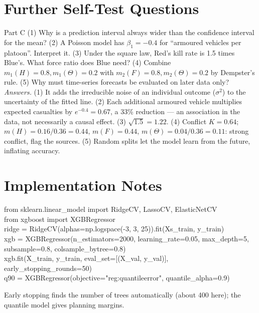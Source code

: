 \documentclass[11pt]{article}
\begin{document}
\section{Further Self-Test Questions}
\begin{question}{Part C}
(1) Why is a prediction interval always wider than the confidence interval for the mean? (2) A Poisson model has $\beta_1=-0.4$ for ``armoured vehicles per platoon''. Interpret it. (3) Under the square law, Red's kill rate is 1.5 times Blue's. What force ratio does Blue need? (4) Combine $m_1(H)=0.8,m_1(\Theta)=0.2$ with $m_2(F)=0.8,m_2(\Theta)=0.2$ by Dempster's rule. (5) Why must time-series forecasts be evaluated on later data only?\\
\textit{Answers.} (1) It adds the irreducible noise of an individual outcome ($\sigma^2$) to the uncertainty of the fitted line. (2) Each additional armoured vehicle multiplies expected casualties by $e^{-0.4}=0.67$, a 33\% reduction --- an association in the data, not necessarily a causal effect. (3) $\sqrt{1.5}=1.22$. (4) Conflict $K=0.64$; $m(H)=0.16/0.36=0.44$, $m(F)=0.44$, $m(\Theta)=0.04/0.36=0.11$: strong conflict, flag the sources. (5) Random splits let the model learn from the future, inflating accuracy.
\end{question}

\section{Implementation Notes}
\begin{center}\begin{minipage}{0.92\textwidth}\small\ttfamily
from sklearn.linear\_model import RidgeCV, LassoCV, ElasticNetCV\\
from xgboost import XGBRegressor\\[2pt]
ridge = RidgeCV(alphas=np.logspace(-3, 3, 25)).fit(Xs\_train, y\_train)\\
xgb = XGBRegressor(n\_estimators=2000, learning\_rate=0.05, max\_depth=5,\\
\hspace*{4em}subsample=0.8, colsample\_bytree=0.8)\\
xgb.fit(X\_train, y\_train, eval\_set=[(X\_val, y\_val)], early\_stopping\_rounds=50)\\
q90 = XGBRegressor(objective="reg:quantileerror", quantile\_alpha=0.9)
\end{minipage}\end{center}
Early stopping finds the number of trees automatically (about 400 here); the quantile model gives planning margins.
\end{document}
